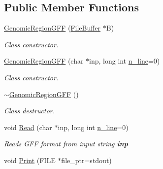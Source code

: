 \subsection*{Public Member Functions}
\begin{DoxyCompactItemize}
\item 
\hypertarget{classGenomicRegionGFF_a9a49f0dc39116964f774e7ce78cfc827}{
\hyperlink{classGenomicRegionGFF_a9a49f0dc39116964f774e7ce78cfc827}{GenomicRegionGFF} (\hyperlink{classFileBuffer}{FileBuffer} $\ast$B)}
\label{classGenomicRegionGFF_a9a49f0dc39116964f774e7ce78cfc827}

\begin{DoxyCompactList}\small\item\em Class constructor. \end{DoxyCompactList}\item 
\hypertarget{classGenomicRegionGFF_a59dee8d6f9e73b1da46386497030beb2}{
\hyperlink{classGenomicRegionGFF_a59dee8d6f9e73b1da46386497030beb2}{GenomicRegionGFF} (char $\ast$inp, long int \hyperlink{classGenomicRegion_aefe2255aeed5338060190ded05cb9c0c}{n\_\-line}=0)}
\label{classGenomicRegionGFF_a59dee8d6f9e73b1da46386497030beb2}

\begin{DoxyCompactList}\small\item\em Class constructor. \end{DoxyCompactList}\item 
\hypertarget{classGenomicRegionGFF_a3885d42a347283a5fed52791988076ad}{
\hyperlink{classGenomicRegionGFF_a3885d42a347283a5fed52791988076ad}{$\sim$GenomicRegionGFF} ()}
\label{classGenomicRegionGFF_a3885d42a347283a5fed52791988076ad}

\begin{DoxyCompactList}\small\item\em Class destructor. \end{DoxyCompactList}\item 
\hypertarget{classGenomicRegionGFF_aeb1390d42b388e32d98f58f57a5c169c}{
void \hyperlink{classGenomicRegionGFF_aeb1390d42b388e32d98f58f57a5c169c}{Read} (char $\ast$inp, long int \hyperlink{classGenomicRegion_aefe2255aeed5338060190ded05cb9c0c}{n\_\-line}=0)}
\label{classGenomicRegionGFF_aeb1390d42b388e32d98f58f57a5c169c}

\begin{DoxyCompactList}\small\item\em Reads GFF format from input string {\bfseries inp} \end{DoxyCompactList}\item 
\hypertarget{classGenomicRegionGFF_a3ffa71d729e4ff060a15a6bab1e924c8}{
void \hyperlink{classGenomicRegionGFF_a3ffa71d729e4ff060a15a6bab1e924c8}{Print} (FILE $\ast$file\_\-ptr=stdout)}
\label{classGenomicRegionGFF_a3ffa71d729e4ff060a15a6bab1e924c8}


\end{DoxyCompactItemize}
